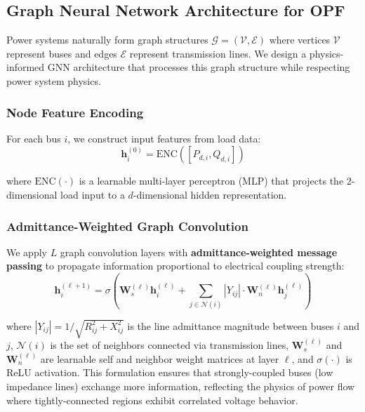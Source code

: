 \documentclass[journal,10pt]{IEEEtran}
\begin{document}
\subsection{Graph Neural Network Architecture for OPF}

Power systems naturally form graph structures $\mathcal{G} = (\mathcal{V}, \mathcal{E})$ where vertices $\mathcal{V}$ represent buses and edges $\mathcal{E}$ represent transmission lines. We design a physics-informed GNN architecture that processes this graph structure while respecting power system physics.

\subsubsection{Node Feature Encoding}
For each bus $i$, we construct input features from load data:
\begin{equation}
\mathbf{h}_i^{(0)} = \text{ENC}([P_{d,i}, Q_{d,i}])
\label{eq:encoding}
\end{equation}

where $\text{ENC}(\cdot)$ is a learnable multi-layer perceptron (MLP) that projects the 2-dimensional load input to a $d$-dimensional hidden representation.

\subsubsection{Admittance-Weighted Graph Convolution}
We apply $L$ graph convolution layers with \textbf{admittance-weighted message passing} to propagate information proportional to electrical coupling strength:
\begin{equation}
\mathbf{h}_i^{(\ell+1)} = \sigma\left(\mathbf{W}_s^{(\ell)} \mathbf{h}_i^{(\ell)} + \sum_{j \in \mathcal{N}(i)} |Y_{ij}| \cdot \mathbf{W}_n^{(\ell)} \mathbf{h}_j^{(\ell)}\right)
\label{eq:gnn_layer}
\end{equation}

where $|Y_{ij}| = 1/\sqrt{R_{ij}^2 + X_{ij}^2}$ is the line admittance magnitude between buses $i$ and $j$, $\mathcal{N}(i)$ is the set of neighbors connected via transmission lines, $\mathbf{W}_s^{(\ell)}$ and $\mathbf{W}_n^{(\ell)}$ are learnable self and neighbor weight matrices at layer $\ell$, and $\sigma(\cdot)$ is ReLU activation. This formulation ensures that strongly-coupled buses (low impedance lines) exchange more information, reflecting the physics of power flow where tightly-connected regions exhibit correlated voltage behavior.
\end{document}

